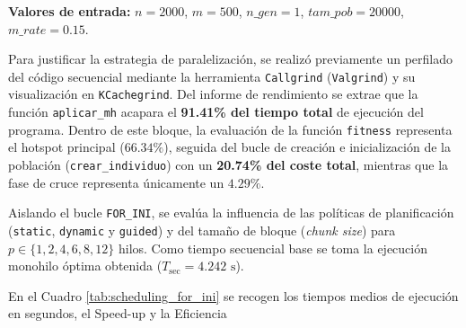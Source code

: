 \documentclass[12pt]{article}
\begin{document}
\begin{enumerate}
\textbf{Valores de entrada:} $n = 2000$, $m = 500$, $n\_gen = 1$, $tam\_pob = 20000$, $m\_rate = 0.15$.

Para justificar la estrategia de paralelización, se realizó previamente un perfilado del código secuencial mediante la herramienta \texttt{Callgrind} (\texttt{Valgrind}) y su visualización en \texttt{KCachegrind}. Del informe de rendimiento se extrae que la función \texttt{aplicar\_mh} acapara el \textbf{91.41\% del tiempo total} de ejecución del programa. Dentro de este bloque, la evaluación de la función \texttt{fitness} representa el hotspot principal ($66.34\%$), seguida del bucle de creación e inicialización de la población (\texttt{crear\_individuo}) con un \textbf{20.74\% del coste total}, mientras que la fase de cruce representa únicamente un $4.29\%$.

Aislando el bucle \texttt{FOR\_INI}, se evalúa la influencia de las políticas de planificación (\texttt{static}, \texttt{dynamic} y \texttt{guided}) y del tamaño de bloque (\textit{chunk size}) para $p \in \{1, 2, 4, 6, 8, 12\}$ hilos. Como tiempo secuencial base se toma la ejecución monohilo óptima obtenida ($T_{\text{sec}} = 4.242\text{ s}$).


En el Cuadro \ref{tab:scheduling_for_ini} se recogen los tiempos medios de ejecución en segundos, el Speed-up  y la Eficiencia 


\end{enumerate}
\end{document}
